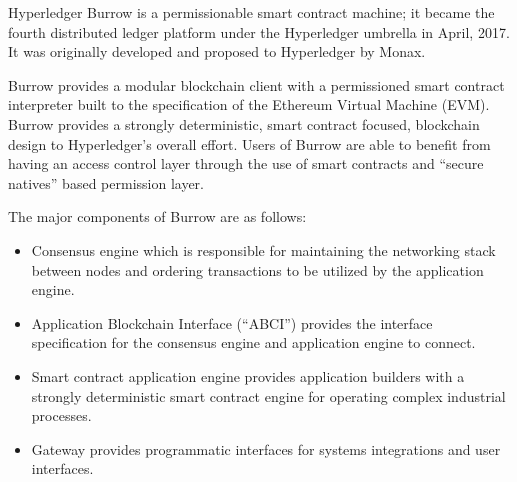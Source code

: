 Hyperledger Burrow is a permissionable smart contract machine; it became the fourth distributed ledger platform under the Hyperledger umbrella in April, 2017. It was originally developed and proposed to Hyperledger by Monax.

Burrow provides a modular blockchain client with a permissioned smart contract interpreter built to the specification of the Ethereum Virtual Machine (EVM). Burrow provides a strongly deterministic, smart contract focused, blockchain design to Hyperledger's overall effort. Users of Burrow are able to benefit from having an access control layer through the use of smart contracts and “secure natives” based permission layer.

The major components of Burrow are as follows:
\begin{itemize}
\item Consensus engine which is responsible for maintaining the networking stack between nodes and ordering transactions to be utilized by the application engine.
\item Application Blockchain Interface (“ABCI”) provides the interface specification for the consensus engine and application engine to connect.
\item Smart contract application engine provides application builders with a strongly deterministic smart contract engine for operating complex industrial processes.
\item Gateway provides programmatic interfaces for systems integrations and user interfaces.
\end{itemize}
